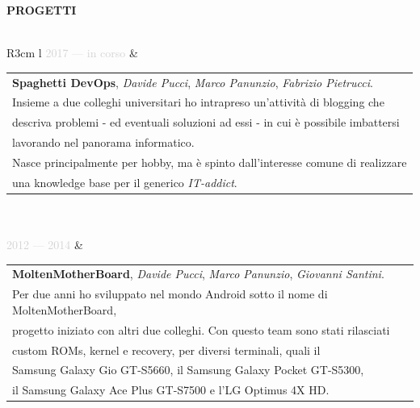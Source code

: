 \documentclass{article}
\begin{document}
\textbf{\textcolor{deepblue}{PROGETTI}} \\\\ \hfill
\begin{tabular}{ R{3cm} l }
	\textcolor{lightgray}{2017 — in corso} &
	\begin{tabular}[l]{@{}l@{}} %
	\textbf{Spaghetti DevOps}, \textit{Davide Pucci}, \textit{Marco Panunzio}, \textit{Fabrizio Pietrucci}. \\
	Insieme a due colleghi universitari ho intrapreso un'attivit\`a di blogging che \\
	descriva problemi - ed eventuali soluzioni ad essi - in cui \`e possibile imbattersi \\
	lavorando nel panorama informatico. \\
	Nasce principalmente per hobby, ma \`e spinto dall'interesse comune di realizzare \\
	una knowledge base per il generico \textit{IT-addict}.
\end{tabular} \\\\ \hfill
\textcolor{lightgray}{2012 — 2014} &
\begin{tabular}[l]{@{}l@{}} %
	\textbf{MoltenMotherBoard}, \textit{Davide Pucci}, \textit{Marco Panunzio}, \textit{Giovanni Santini}. \\
	Per due anni ho sviluppato nel mondo Android sotto il nome di MoltenMotherBoard,                       \\
	progetto iniziato con altri due colleghi. Con questo team sono stati rilasciati                        \\
	custom ROMs, kernel e recovery, per diversi terminali, quali il                                        \\
	Samsung Galaxy Gio GT-S5660, il Samsung Galaxy Pocket GT-S5300,                                        \\
	il Samsung Galaxy Ace Plus GT-S7500 e l'LG Optimus 4X HD.
\end{tabular} \\\\ \hfill
\end{tabular}
\end{document}
